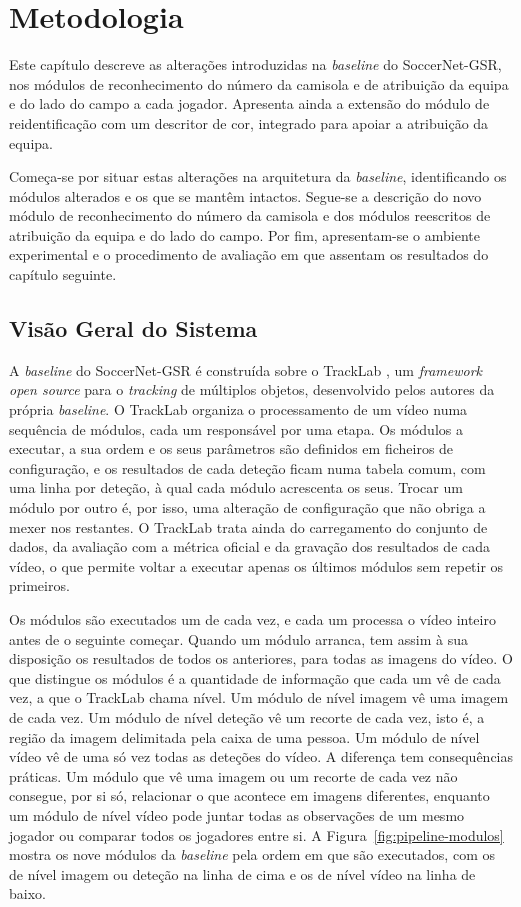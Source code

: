 \chapter{Metodologia}\label{cap:metodologia}

Este capítulo descreve as alterações introduzidas na \emph{baseline} do SoccerNet-GSR, nos módulos de reconhecimento do número da camisola e de atribuição da equipa e do lado do campo a cada jogador. Apresenta ainda a extensão do módulo de reidentificação com um descritor de cor, integrado para apoiar a atribuição da equipa.

Começa-se por situar estas alterações na arquitetura da \emph{baseline}, identificando os módulos alterados e os que se mantêm intactos. Segue-se a descrição do novo módulo de reconhecimento do número da camisola e dos módulos reescritos de atribuição da equipa e do lado do campo. Por fim, apresentam-se o ambiente experimental e o procedimento de avaliação em que assentam os resultados do capítulo seguinte.

\section{Visão Geral do Sistema}

A \emph{baseline} do SoccerNet-GSR é construída sobre o TrackLab \citep{joos2024tracklab}, um \emph{framework} \emph{open source} para o \emph{tracking} de múltiplos objetos, desenvolvido pelos autores da própria \emph{baseline}. O TrackLab organiza o processamento de um vídeo numa sequência de módulos, cada um responsável por uma etapa. Os módulos a executar, a sua ordem e os seus parâmetros são definidos em ficheiros de configuração, e os resultados de cada deteção ficam numa tabela comum, com uma linha por deteção, à qual cada módulo acrescenta os seus. Trocar um módulo por outro é, por isso, uma alteração de configuração que não obriga a mexer nos restantes. O TrackLab trata ainda do carregamento do conjunto de dados, da avaliação com a métrica oficial e da gravação dos resultados de cada vídeo, o que permite voltar a executar apenas os últimos módulos sem repetir os primeiros.

Os módulos são executados um de cada vez, e cada um processa o vídeo inteiro antes de o seguinte começar. Quando um módulo arranca, tem assim à sua disposição os resultados de todos os anteriores, para todas as imagens do vídeo. O que distingue os módulos é a quantidade de informação que cada um vê de cada vez, a que o TrackLab chama nível. Um módulo de nível imagem vê uma imagem de cada vez. Um módulo de nível deteção vê um recorte de cada vez, isto é, a região da imagem delimitada pela caixa de uma pessoa. Um módulo de nível vídeo vê de uma só vez todas as deteções do vídeo. A diferença tem consequências práticas. Um módulo que vê uma imagem ou um recorte de cada vez não consegue, por si só, relacionar o que acontece em imagens diferentes, enquanto um módulo de nível vídeo pode juntar todas as observações de um mesmo jogador ou comparar todos os jogadores entre si. A Figura~\ref{fig:pipeline-modulos} mostra os nove módulos da \emph{baseline} pela ordem em que são executados, com os de nível imagem ou deteção na linha de cima e os de nível vídeo na linha de baixo.

